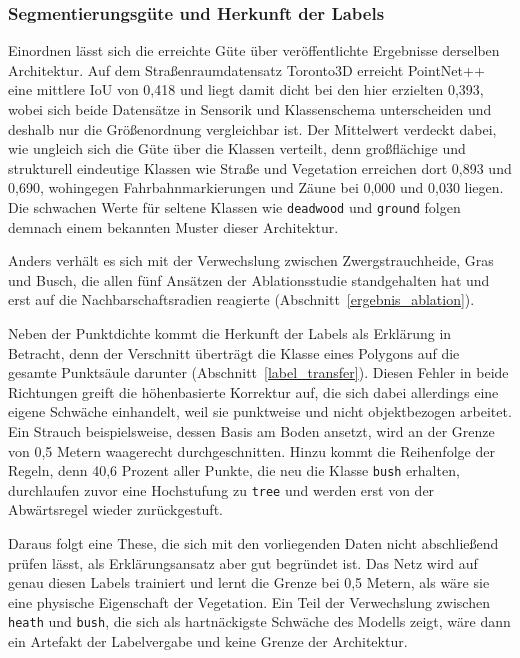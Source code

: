 \subsubsection{Segmentierungsgüte und Herkunft der Labels}

Einordnen lässt sich die erreichte Güte über veröffentlichte Ergebnisse
derselben Architektur. Auf dem Straßenraumdatensatz Toronto3D erreicht
PointNet++ eine mittlere IoU von 0,418 \cite{Diab.2022} und liegt damit dicht
bei den hier erzielten 0,393, wobei sich beide Datensätze in Sensorik und
Klassenschema unterscheiden und deshalb nur die Größenordnung vergleichbar ist.
Der Mittelwert verdeckt dabei, wie ungleich sich die Güte über die Klassen
verteilt, denn großflächige und strukturell eindeutige Klassen wie Straße und
Vegetation erreichen dort 0,893 und 0,690, wohingegen Fahrbahnmarkierungen und
Zäune bei 0,000 und 0,030 liegen. Die schwachen Werte für seltene Klassen wie
\texttt{deadwood} und \texttt{ground} folgen demnach einem bekannten Muster
dieser Architektur.

Anders verhält es sich mit der Verwechslung zwischen Zwergstrauchheide, Gras
und Busch, die allen fünf Ansätzen der Ablationsstudie standgehalten hat und
erst auf die Nachbarschaftsradien reagierte (Abschnitt~\ref{ergebnis_ablation}).

Neben der Punktdichte kommt die Herkunft der Labels als Erklärung in Betracht,
denn der Verschnitt überträgt die Klasse eines Polygons auf die gesamte
Punktsäule darunter (Abschnitt~\ref{label_transfer}). Diesen Fehler in beide Richtungen greift die höhenbasierte Korrektur auf, die sich dabei allerdings eine eigene Schwäche einhandelt, weil sie punktweise und nicht objektbezogen arbeitet. Ein Strauch beispielsweise, dessen Basis am Boden ansetzt, wird an der Grenze von 0,5 Metern waagerecht durchgeschnitten. Hinzu kommt die Reihenfolge der Regeln, denn 40,6 Prozent aller Punkte, die neu die Klasse \texttt{bush} erhalten, durchlaufen zuvor eine Hochstufung zu \texttt{tree} und werden erst von der Abwärtsregel wieder zurückgestuft.

Daraus folgt eine These, die sich mit den vorliegenden Daten nicht abschließend
prüfen lässt, als Erklärungsansatz aber gut begründet ist. Das Netz wird auf
genau diesen Labels trainiert und lernt die Grenze bei 0,5 Metern, als wäre sie
eine physische Eigenschaft der Vegetation. Ein Teil der Verwechslung zwischen
\texttt{heath} und \texttt{bush}, die sich als hartnäckigste Schwäche des
Modells zeigt, wäre dann ein Artefakt der Labelvergabe und keine Grenze der
Architektur.

